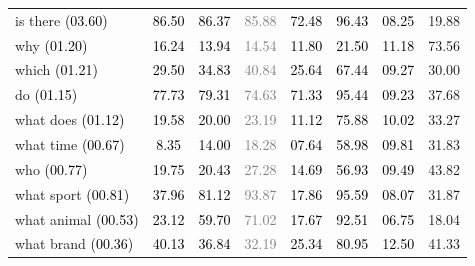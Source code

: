 \begin{table}[h]
\begin{center}
\begin{tabular}{@{} l  c  c  c  c c c c@{}  }
is there \textcolor{black}{(03.60)} & \textcolor{black}{86.50} & \textcolor{black}{86.37} & \textcolor{gray}{85.88} & \textcolor{black}{72.48} & \textcolor{black}{96.43} &\textcolor{black}{08.25} & 19.88\\
why \textcolor{black}{(01.20)} & \textcolor{black}{16.24} & \textcolor{black}{13.94} & \textcolor{gray}{14.54} & \textcolor{black}{11.80} & \textcolor{black}{21.50} &\textcolor{black}{11.18} & 73.56\\
which \textcolor{black}{(01.21)} & \textcolor{black}{29.50} & \textcolor{black}{34.83} & \textcolor{gray}{40.84} & \textcolor{black}{25.64} & \textcolor{black}{67.44} &\textcolor{black}{09.27} & 30.00\\
do \textcolor{black}{(01.15)} & \textcolor{black}{77.73} & \textcolor{black}{79.31} & \textcolor{gray}{74.63} & \textcolor{black}{71.33} & \textcolor{black}{95.44} &\textcolor{black}{09.23} & 37.68\\
what does \textcolor{black}{(01.12)} & \textcolor{black}{19.58} & \textcolor{black}{20.00} & \textcolor{gray}{23.19} & \textcolor{black}{11.12} & \textcolor{black}{75.88} &\textcolor{black}{10.02} & 33.27\\
what time \textcolor{black}{(00.67)} & \textcolor{black}{8.35} & \textcolor{black}{14.00} & \textcolor{gray}{18.28} & \textcolor{black}{07.64} & \textcolor{black}{58.98} &\textcolor{black}{09.81} & 31.83\\
who \textcolor{black}{(00.77)} & \textcolor{black}{19.75} & \textcolor{black}{20.43} & \textcolor{gray}{27.28} & \textcolor{black}{14.69} & \textcolor{black}{56.93} &\textcolor{black}{09.49} & 43.82\\
what sport \textcolor{black}{(00.81)} & \textcolor{black}{37.96} & \textcolor{black}{81.12} & \textcolor{gray}{93.87} & \textcolor{black}{17.86} & \textcolor{black}{95.59} &\textcolor{black}{08.07} & 31.87\\
what animal \textcolor{black}{(00.53)} & \textcolor{black}{23.12} & \textcolor{black}{59.70} & \textcolor{gray}{71.02} & \textcolor{black}{17.67} & \textcolor{black}{92.51} &\textcolor{black}{06.75} & 18.04\\
what brand \textcolor{black}{(00.36)} & \textcolor{black}{40.13} & \textcolor{black}{36.84} & \textcolor{gray}{32.19} & \textcolor{black}{25.34} & \textcolor{black}{80.95} &\textcolor{black}{12.50} & 41.33\\
                                                                                                                                                             

\end{tabular}
\end{center}
\end{table}
